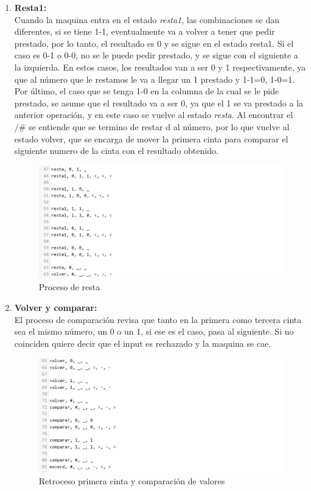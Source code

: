 \documentclass[12pt]{article}
\begin{document}
\begin{enumerate}
\newpage

\item \textbf{Resta1:}\\
Cuando la maquina entra en el estado \textit{resta1}, las combinaciones se dan diferentes, si se tiene 1-1, eventualmente va a volver a tener que pedir prestado, por lo tanto, el resultado es 0 y se sigue en el estado resta1. Si el caso es 0-1 o 0-0, no se le puede pedir prestado, y se sigue con el siguiente a la izquierda. En estos casos, los resultados van a ser 0 y 1 respectivamente, ya que al número que le restamos le va a llegar un 1 prestado y 1-1=0, 1-0=1. Por último, el caso que se tenga 1-0 en la columna de la cual se le pide prestado, se asume que el resultado va a ser 0, ya que el 1 se va prestado a la anterior operación, y en este caso se vuelve al estado \textit{resta}. Al encontrar el /# se entiende que se termino de restar d al número, por lo que vuelve al estado volver, que se encarga de mover la primera cinta para comparar el siguiente numero de la cinta con el resultado obtenido.

\begin{figure}[h]
    \centering
    \includegraphics[width=\textwidth]{fotos/Screenshot 2021-11-27 181502}
    \caption{Proceso de resta}
\end{figure}

\newpage
\item \textbf{Volver y comparar:}\\

El proceso de comparación revisa que tanto en la primera como tercera cinta sea el mismo número, un 0 o un 1, si ese es el caso, pasa al siguiente. Si no coinciden quiere decir que el input es rechazado y la maquina se cae.

\begin{figure}[h]
    \centering
    \includegraphics[width=\textwidth]{fotos/Screenshot 2021-11-27 181838}
    \caption{Retroceso primera cinta y comparación de valores}
\end{figure}



\end{enumerate}
\end{document}
